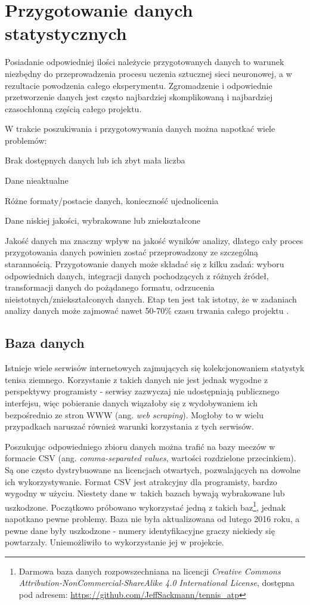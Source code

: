 \chapter{Przygotowanie danych statystycznych}
Posiadanie odpowiedniej ilości należycie przygotowanych danych to warunek niezbędny do przeprowadzenia procesu uczenia sztucznej sieci neuronowej, a w rezultacie powodzenia całego eksperymentu. Zgromadzenie i odpowiednie przetworzenie danych jest często najbardziej skomplikowaną i najbardziej czasochłonną częścią całego projektu. 

W trakcie poszukiwania i przygotowywania danych można napotkać wiele problemów:
\begin{tightitemize}
\item Brak dostępnych danych lub ich zbyt mała liczba
\item Dane nieaktualne
\item Różne formaty/postacie danych, konieczność ujednolicenia
\item Dane niskiej jakości, wybrakowane lub zniekształcone
\end{tightitemize}

Jakość danych ma znaczny wpływ na jakość wyników analizy, dlatego cały proces przygotowania danych powinien zostać przeprowadzony ze szczególną starannością. Przygotowanie danych może składać się z kilku zadań: wyboru odpowiednich danych, integracji danych pochodzących z różnych źródeł, transformacji danych do pożądanego formatu, odrzucenia nieistotnych/zniekształconych danych. Etap ten jest tak istotny, że w zadaniach analizy danych może zajmować nawet 50-70\% czasu trwania całego projektu \cite{satt01}.

\section{Baza danych}
\label{Sec:DataBase}
Istnieje wiele serwisów internetowych zajmujących się kolekcjonowaniem statystyk tenisa ziemnego. Korzystanie z takich danych nie jest jednak wygodne z perspektywy programisty - serwisy zazwyczaj nie udostępniają publicznego interfejsu, więc pobieranie danych wiązałoby się z wydobywaniem ich bezpośrednio ze stron WWW (ang. \textit{web scraping}). Mogłoby to w wielu przypadkach naruszać również warunki korzystania z tych serwisów.

Poszukując odpowiedniego zbioru danych można trafić na bazy meczów w formacie CSV (ang. \textit{comma-separated values}, wartości rozdzielone przecinkiem). Są one często dystrybuowane na licencjach otwartych, pozwalających na dowolne ich wykorzystywanie. Format CSV jest atrakcyjny dla programisty, bardzo wygodny w użyciu. Niestety dane w~takich bazach bywają wybrakowane lub uszkodzone. Początkowo próbowano wykorzystać jedną z takich baz\footnote{Darmowa baza danych rozpowszechniana na licencji \textit{Creative Commons Attribution-NonCommercial-ShareAlike 4.0 International License}, dostępna pod adresem: \url{https://github.com/JeffSackmann/tennis_atp}}, jednak napotkano pewne problemy. Baza nie była aktualizowana od lutego 2016 roku, a pewne dane były uszkodzone - numery identyfikacyjne graczy niekiedy się powtarzały. Uniemożliwiło to wykorzystanie jej w projekcie.

